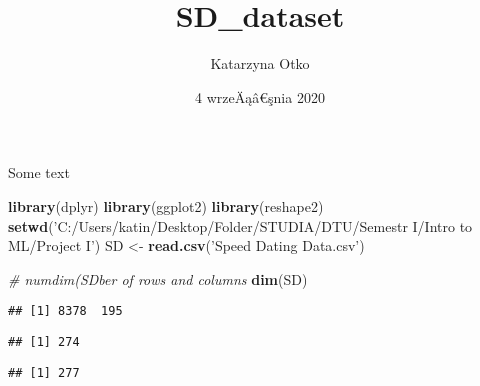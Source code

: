 \documentclass[]{article}
\title{SD\_dataset}
\author{Katarzyna Otko}
\date{4 wrzeÄąâ\euro{}şnia 2020}
\newenvironment{Shaded}{\begin{snugshade}}{\end{snugshade}}
\newcommand{\KeywordTok}[1]{\textcolor[rgb]{0.13,0.29,0.53}{\textbf{#1}}}
\newcommand{\DecValTok}[1]{\textcolor[rgb]{0.00,0.00,0.81}{#1}}
\newcommand{\StringTok}[1]{\textcolor[rgb]{0.31,0.60,0.02}{#1}}
\newcommand{\CommentTok}[1]{\textcolor[rgb]{0.56,0.35,0.01}{\textit{#1}}}
\newcommand{\OperatorTok}[1]{\textcolor[rgb]{0.81,0.36,0.00}{\textbf{#1}}}
\newcommand{\NormalTok}[1]{#1}
\begin{document}
\maketitle

Some text

\begin{Shaded}
\begin{Highlighting}[]
\KeywordTok{library}\NormalTok{(dplyr)}
\KeywordTok{library}\NormalTok{(ggplot2)}
\KeywordTok{library}\NormalTok{(reshape2)}
\KeywordTok{setwd}\NormalTok{(}\StringTok{'C:/Users/katin/Desktop/Folder/STUDIA/DTU/Semestr I/Intro to ML/Project I'}\NormalTok{)}
\NormalTok{SD <-}\StringTok{ }\KeywordTok{read.csv}\NormalTok{(}\StringTok{'Speed Dating Data.csv'}\NormalTok{)}

\CommentTok{# numdim(SDber of rows and columns}
\KeywordTok{dim}\NormalTok{(SD)}
\end{Highlighting}
\end{Shaded}

\begin{verbatim}
## [1] 8378  195
\end{verbatim}

\begin{Shaded}
\end{Shaded}

\begin{verbatim}
## [1] 274
\end{verbatim}

\begin{Shaded}
\end{Shaded}

\begin{verbatim}
## [1] 277
\end{verbatim}
\end{document}

